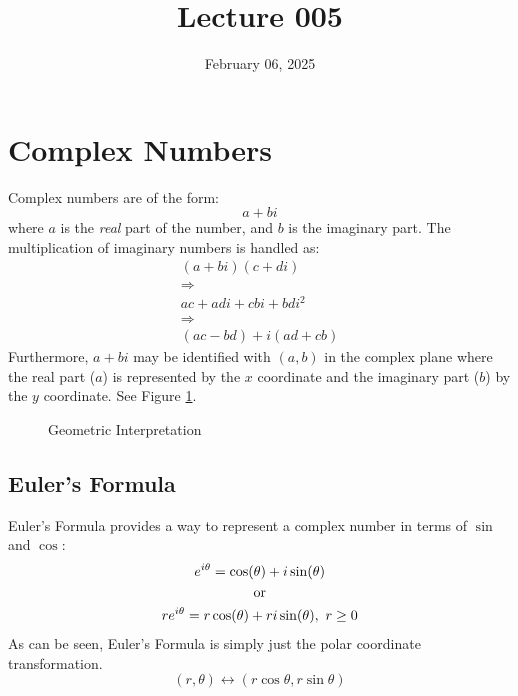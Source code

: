 \documentclass[12pt]{article}
\title{Lecture 005}
\date{February 06, 2025}
\begin{document}
\newpage
\section{Complex Numbers}
\label{sec:complexNumbers}

Complex numbers are of the form:
\begin{equation*}
  a + bi
\end{equation*}
where $a$ is the \textit{real} part of the number, and $b$ is the imaginary part. The multiplication of imaginary numbers is handled as:
\begin{gather*}
  (a+bi)(c+di) \\
  \Rightarrow \\
  ac + adi + cbi + bdi^2 \\
  \Rightarrow \\
  (ac-bd)+i(ad+cb)
\end{gather*}
Furthermore, $a+bi$ may be identified with $(a,b)$ in the complex plane where the real part ($a$) is represented by the $x$ coordinate and the imaginary part ($b$) by the $y$ coordinate. See Figure \ref{fig:010}.
\begin{figure}[H]
  \centering
  
  \caption{Geometric Interpretation}
  \label{fig:010}
\end{figure}

\subsection{Euler's Formula}
\label{ssec:eulersFormula}

Euler's Formula provides a way to represent a complex number in terms of $\sin$ and $\cos$:
\begin{gather*}
  e^{i\theta} = \cos(\theta) + i\sin(\theta) \\
  \textup{or} \\
  re^{i\theta} = r\cos(\theta) + ri\sin(\theta),\ r \ge 0
\end{gather*}
As can be seen, Euler's Formula is simply just the polar coordinate transformation.
\begin{equation*}
  (r, \theta) \leftrightarrow (r \cos \theta, r \sin \theta)
\end{equation*}

\begin{wrapfigure}[]{r}{0.2\textwidth}
  \vspace{-20pt}
  \centering
  
\end{wrapfigure}
\end{document}
